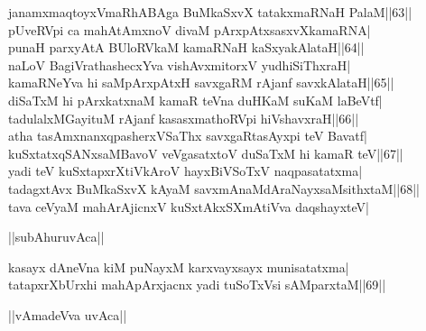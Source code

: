 \documentclass{article}
\begin{document}
janamxmaqtoyxVmaRhABAga BuMkaSxvX tatakxmaRNaH PalaM||63||\\
pUveRVpi ca mahAtAmxnoV divaM pArxpAtxsasxvXkamaRNA|\\
punaH parxyAtA BUloRVkaM kamaRNaH kaSxyakAlataH||64||\\
naLoV BagiVrathashecxYva vishAvxmitorxV yudhiSiThxraH|\\
kamaRNeYva hi saMpArxpAtxH savxgaRM rAjanf savxkAlataH||65||\\
diSaTxM hi pArxkatxnaM kamaR teVna duHKaM suKaM laBeVtf|\\
tadulalxMGayituM rAjanf kasasxmathoRVpi hiVshavxraH||66||\\
atha tasAmxnanxqpasherxVSaThx savxgaRtasAyxpi teV Bavatf|\\
kuSxtatxqSANxsaMBavoV veVgasatxtoV duSaTxM hi kamaR teV||67||\\
yadi teV kuSxtapxrXtiVkAroV hayxBiVSoTxV naqpasatatxma|\\
tadagxtAvx BuMkaSxvX kAyaM savxmAnaMdAraNayxsaMsithxtaM||68||\\
tava ceVyaM mahArAjicnxV kuSxtAkxSXmAtiVva daqshayxteV|\\

\begin{center}
||subAhuruvAca||
\end{center}

kasayx dAneVna kiM puNayxM karxvayxsayx munisatatxma|\\
tatapxrXbUrxhi mahApArxjacnx yadi tuSoTxVsi sAMparxtaM||69||\\

\begin{center}
||vAmadeVva uvAca||
\end{center}
\end{document}
